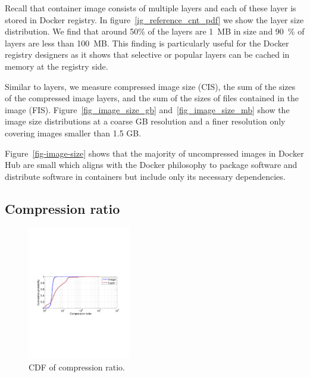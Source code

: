 
Recall that container image consists of multiple layers and each of these layer is stored in Docker registry.
In figure~\ref{ig_reference_cnt_pdf} we show the layer size distribution. We find that around 50\% of the
layers are 1~MB in size and 90~\% of layers are less than 100~MB. This finding is particularly
useful for the Docker registry designers as it shows that selective or popular layers can be cached in memory
at the registry side.

Similar to layers, we measure compressed image size
(CIS), \ie the sum of the sizes of the compressed image layers, and the sum of the
sizes of files contained in the image (FIS). Figure~\ref{fig_image_size_gb}
and~\ref{fig_image_size_mb} show the image size distributions at a coarse GB resolution
and a finer resolution only covering images smaller than 1.5 GB.

Figure~\ref{fig-image-size} shows that the majority of uncompressed images in Docker Hub are
small which aligns with the Docker philosophy to package software and distribute
software in containers but include only its necessary dependencies.


\subsection{Compression ratio}
\begin{figure}
	\centering
	\includegraphics[width=0.4\textwidth]{graphs/compress-ratio-cdf.pdf}
	\caption{CDF of compression ratio.
	}
	\label{fig:compress-ratio}
\end{figure}

